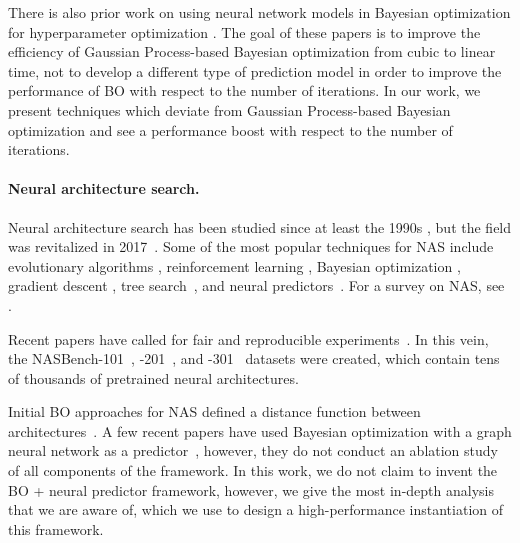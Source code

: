 \documentclass[11pt]{article}
\numberwithin{equation}{section}
\numberwithin{figure}{section}
\theoremstyle{plain}
\theoremstyle{definition}
\begin{document}
There is also prior work on using neural network models in
Bayesian optimization for hyperparameter optimization
\cite{snoek2015scalable, springenberg2016bayesian}.
The goal of these papers is to improve the efficiency of 
Gaussian Process-based Bayesian optimization from cubic to linear time,
not to develop a different type of prediction model in order to
improve the performance of BO with respect to the number of iterations. 
In our work, we present techniques which deviate
from Gaussian Process-based Bayesian optimization and see a 
performance boost with respect to the number of iterations.


\paragraph{Neural architecture search.}
Neural architecture search has been studied since at least the 1990s \cite{floreano2008neuroevolution, kitano1990designing, stanley2002evolving},
but the field was revitalized in 2017~\cite{zoph2017neural}. 
Some of the most popular techniques for NAS include evolutionary algorithms \cite{amoebanet, maziarz2018evolutionary}, reinforcement learning \cite{zoph2017neural, enas, pnas, efficientnets, wang2019sample}, Bayesian optimization \cite{nasbot, auto-keras, bayesnas}, gradient descent \cite{darts, darts+, prdarts}, tree search~\cite{alphax,wang2019sample}, 
and neural predictors~\cite{shi2019multi, wen2019neural}.
For a survey on NAS, see \cite{nas-survey}.

Recent papers have called for fair and reproducible experiments~\cite{randomnas,  nasbench}.
In this vein, the NASBench-101~\cite{nasbench}, -201~\cite{nasbench201},
and -301~\cite{nasbench301} datasets 
were created, which contain tens of thousands of pretrained neural architectures.

Initial BO approaches for NAS defined a distance function between 
architectures~\cite{nasbot, auto-keras}.
A few recent papers have used Bayesian optimization with a graph neural
network as a predictor~\cite{ma2019deep, shi2019multi},
however, they do not conduct an ablation study of all components of the 
framework.
In this work, we do not claim to invent the BO + neural predictor framework,
however, we give the most in-depth analysis that we are aware of, which we
use to design a high-performance instantiation of this framework.
\end{document}
